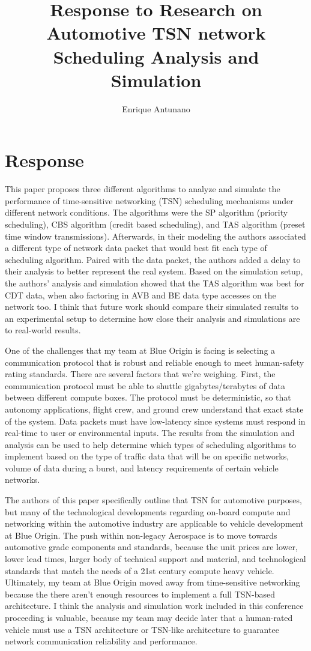 \documentclass{article}
\title{Response to Research on Automotive TSN network Scheduling Analysis and Simulation}
\author{Enrique Antunano}
\begin{document}
\maketitle

\section{Response}

This paper proposes three different algorithms to analyze and simulate the performance of time-sensitive networking (TSN) scheduling mechanisms under different network conditions. 
The algorithms were the SP algorithm (priority scheduling), CBS algorithm (credit based scheduling), and TAS algorithm (preset time window transmissions).
Afterwards, in their modeling the authors associated a different type of network data packet that would best fit each type of scheduling algorithm.
Paired with the data packet, the authors added a delay to their analysis to better represent the real system. 
Based on the simulation setup, the authors' analysis and simulation showed that the TAS algorithm was best for CDT data, when also factoring in AVB and BE data type accesses on the network too.
I think that future work should compare their simulated results to an experimental setup to determine how close their analysis and simulations are to real-world results. 

One of the challenges that my team at Blue Origin is facing is selecting a communication protocol that is robust and reliable enough to meet human-safety rating standards. There are several factors that we're weighing.
First, the communication protocol must be able to shuttle gigabytes/terabytes of data between different compute boxes. The protocol must be deterministic, so that autonomy applications, flight crew, and ground crew understand that exact state of the system.
Data packets must have low-latency since systems must respond in real-time to user or environmental inputs.
The results from the simulation and analysis can be used to help determine which types of scheduling algorithms to implement based on the type of traffic data that will be on specific networks, volume of data during a burst, and latency requirements of certain vehicle networks.

The authors of this paper specifically outline that TSN for automotive purposes, but many of the technological developments regarding on-board compute and networking within the automotive industry are applicable to vehicle development at Blue Origin. 
The push within non-legacy Aerospace is to move towards automotive grade components and standards, because the unit prices are lower, lower lead times, larger body of technical support and material, and technological standards that match the needs of a 21st century compute heavy vehicle.
Ultimately, my team at Blue Origin moved away from time-sensitive networking because the there aren't enough resources to implement a full TSN-based architecture. 
I think the analysis and simulation work included in this conference proceeding is valuable, because my team may decide later that a human-rated vehicle must use a TSN architecture or TSN-like architecture to guarantee network communication reliability and performance.

\nocite{*}



\end{document}
